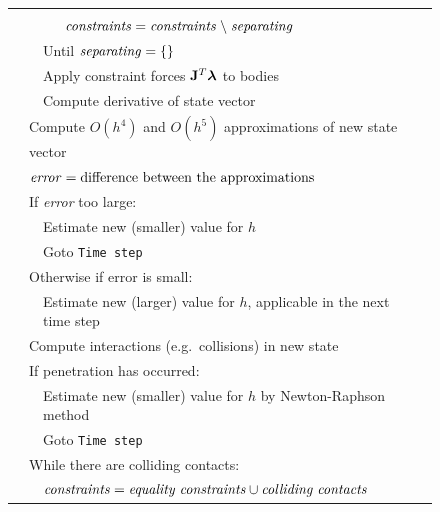 \begin{figure}
\begin{tabular}{|l|l|l|l|@{}l}
            \curly{\ref{restingContact}}{\spx\spx\spx\spx\spx\spx\spx}\\\cline{4-4}
            &&&$\mbox{\textit{constraints}} = \mbox{\textit{constraints}} \;\backslash\;
            \mbox{\textit{separating}}$\\\cline{4-4}
        &&\multicolumn{2}{|l|}{Until $\mbox{\textit{separating}} = \{\}$}\\\cline{3-4}
        &&\multicolumn{2}{|l|}{Apply constraint forces $\m{J}^T\ve{\lambda}$ to bodies}\\\cline{3-4}
        &&\multicolumn{2}{|l|}{Compute derivative of state vector}&
        \curly{\ref{rigidBodyDynamics}}{\spx}\\\cline{2-4}
    &\multicolumn{3}{|l|}{Compute $O(h^4)$ and $O(h^5)$ approximations of new state vector}\\\cline{2-4}
    &\multicolumn{3}{|l|}{$\mbox{\textit{error}} = \mbox{difference between the approximations}$}\\\cline{2-4}
    &\multicolumn{3}{|l|}{If \textit{error} too large:}\\\cline{3-4}
        &&\multicolumn{2}{|l|}{Estimate new (smaller) value for $h$}&
        \curly{\ref{solvingODEs}}{\spx\spx\spx\spx\spx\spx\spx}\\\cline{3-4}
        &&\multicolumn{2}{|l|}{Goto \texttt{Time step}}\\\cline{2-4}
    &\multicolumn{3}{|l|}{Otherwise if error is small:}\\\cline{3-4}
        &&\multicolumn{2}{|l|}{Estimate new (larger) value for $h$, applicable in the next time step}\\\cline{2-4}
    &\multicolumn{3}{|l|}{Compute interactions (e.g.\ collisions) in new state}&
    \curly{\ref{meshIntersection}}{\spx}\\\cline{2-4}
    &\multicolumn{3}{|l|}{If penetration has occurred:}\\\cline{3-4}
        &&\multicolumn{2}{|l|}{Estimate new (smaller) value for $h$ by Newton-Raphson method}&
        \curly{\ref{findingContactTime}}{\spx\spx\spx}\\\cline{3-4}
        &&\multicolumn{2}{|l|}{Goto \texttt{Time step}}\\\cline{2-4}
    &\multicolumn{3}{|l|}{While there are colliding contacts:}\\\cline{3-4}
        &&\multicolumn{2}{|l|}{$\mbox{\textit{constraints}} = \mbox{\textit{equality constraints}}
        \cup \mbox{\textit{colliding contacts}}$}\\\cline{3-4}

\end{tabular}
\end{figure}
